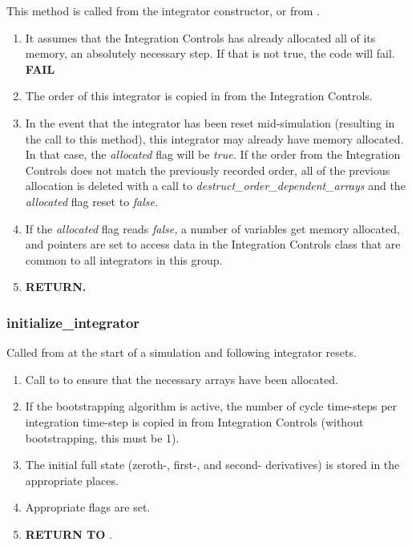 This method is called from the integrator constructor, or from
.

\begin{enumerate}
\item It assumes that the Integration Controls has already allocated all
of its memory, an absolutely necessary step. If that is not true, the
code will fail. \textbf{FAIL}

\item The order of this integrator is copied in from the Integration
Controls.

\item In the event that the integrator has been reset mid-simulation
(resulting in the call to this method), this integrator may already have
memory allocated. In that case, the \textit{allocated} flag will be
\textit{true.} If the order from the Integration Controls does not
match the previously recorded order, all of the previous allocation is
deleted with a call to \textit{destruct\_order\_dependent\_arrays} and
the \textit{allocated} flag reset to \textit{false.}

\item If the \textit{allocated} flag reads \textit{false,} a number of
variables get memory allocated, and pointers are set to access data in
the Integration Controls class that are common to all integrators in
this group. 
\item {\bfseries RETURN.}
\end{enumerate}


\subsubsection{initialize\_integrator}\label{ref:GJ_initialize_integrator}

Called from  at the start of a simulation and
following integrator resets.

\begin{enumerate}
\item Call to 
to ensure that
the necessary arrays have been allocated.
\item If the bootstrapping algorithm is active, the number of cycle
time-steps per integration time-step is copied in from Integration
Controls (without bootstrapping, this must be 1).
\item The initial full state (zeroth-, first-, and second- derivatives)
is stored in the appropriate places.
\item Appropriate flags are set.
\item {\bfseries RETURN TO} .
\end{enumerate}

